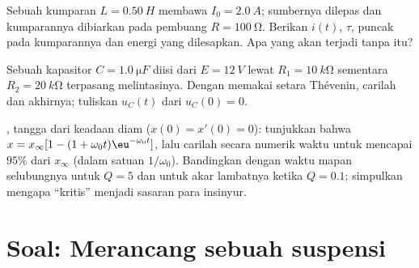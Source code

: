 \begin{exercise}[$\star\star\star$]\label{exo:b1:transient-regimes:10}
Sebuah kumparan $L = \qty{0.50}{H}$ membawa $I_0 = \qty{2.0}{A}$;
sumbernya dilepas dan kumparannya dibiarkan pada  pembuang
$R = \qty{100}{\ohm}$. Berikan $i(t)$, $\tau$,  puncak pada
kumparannya dan energi yang dilesapkan. Apa yang akan terjadi tanpa
 itu?
\end{exercise}

\begin{exercise}[$\star\star\star$]\label{exo:b1:transient-regimes:11}
Sebuah kapasitor $C = \qty{1.0}{\micro F}$ diisi dari $E = \qty{12}{V}$
lewat $R_1 = \qty{10}{k\ohm}$ sementara $R_2 = \qty{20}{k\ohm}$ terpasang
melintasinya. Dengan memakai setara Thévenin, carilah 
dan  akhirnya; tuliskan $u_C(t)$ dari $u_C(0) = 0$.
\end{exercise}

\begin{exercise}[$\star\star\star$]\label{exo:b1:transient-regimes:12}
, tangga dari keadaan diam ($x(0) = x'(0) = 0$): tunjukkan
bahwa $x = x_\infty[1 - (1 + \omega_0 t)\eu^{-\omega_0 t}]$, lalu carilah
secara numerik waktu untuk mencapai $95\%$ dari $x_\infty$ (dalam satuan
$1/\omega_0$). Bandingkan dengan waktu mapan selubungnya untuk $Q = 5$
dan untuk akar lambatnya ketika $Q = 0.1$; simpulkan mengapa ``kritis''
menjadi sasaran para insinyur.
\end{exercise}

\section{Soal: Merancang sebuah suspensi}

